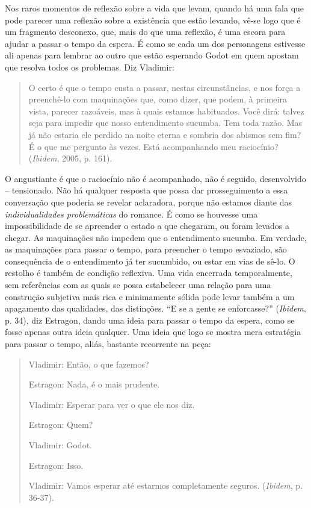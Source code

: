 Nos raros momentos de reflexão sobre a vida que levam, quando há uma
fala que pode parecer uma reflexão sobre a existência que estão levando,
vê-se logo que é um fragmento desconexo, que, mais do que uma reflexão,
é uma escora para ajudar a passar o tempo da espera. É como se cada um
dos personagens estivesse ali apenas para lembrar ao outro que estão
esperando Godot em quem apostam que resolva todos os problemas. Diz
Vladimir:

\begin{quote}
O certo é que o tempo custa a passar, nestas circunstâncias, e nos força
a preenchê-lo com maquinações que, como dizer, que podem, à primeira
vista, parecer razoáveis, mas à quais estamos habituados. Você dirá:
talvez seja para impedir que nosso entendimento sucumba. Tem toda razão.
Mas já não estaria ele perdido na noite eterna e sombria dos abismos sem
fim? É o que me pergunto às vezes. Está acompanhando meu raciocínio?
(\emph{Ibidem}, 2005, p. 161).
\end{quote}

O angustiante é que o raciocínio não é acompanhado, não é seguido,
desenvolvido -- tensionado. Não há qualquer resposta que possa dar
prosseguimento a essa conversação que poderia se revelar aclaradora,
porque não estamos diante das \emph{individualidades problemáticas} do
romance. É como se houvesse uma impossibilidade de se apreender o estado
a que chegaram, ou foram levados a chegar. As maquinações não impedem
que o entendimento sucumba. Em verdade, as maquinações para passar o
tempo, para preencher o tempo esvaziado, são consequência de o
entendimento já ter sucumbido, ou estar em vias de sê-lo. O restolho é
também de condição reflexiva. Uma vida encerrada temporalmente, sem
referências com as quais se possa estabelecer uma relação para uma
construção subjetiva mais rica e minimamente sólida pode levar também a
um apagamento das qualidades, das distinções. ``E se a gente se
enforcasse?'' (\emph{Ibidem}, p. 34), diz Estragon, dando uma ideia para
passar o tempo da espera, como se fosse apenas outra ideia qualquer. Uma
ideia que logo se mostra mera estratégia para passar o tempo, aliás,
bastante recorrente na peça:

\begin{quote}
\forceindent{}Vladimir: Então, o que fazemos?

Estragon: Nada, é o mais prudente.

Vladimir: Esperar para ver o que ele nos diz.

Estragon: Quem?

Vladimir: Godot.

Estragon: Isso.

Vladimir: Vamos esperar até estarmos completamente seguros.
(\emph{Ibidem}, p. 36-37).
\end{quote}

